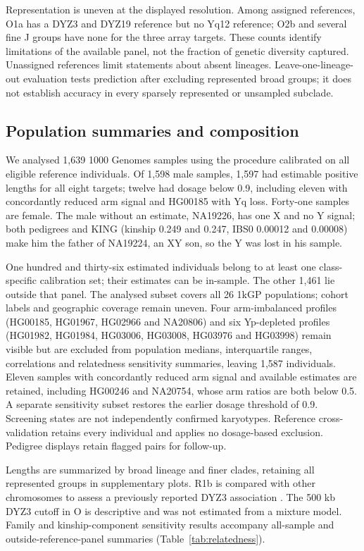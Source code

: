 \documentclass[pdflatex,sn-nature]{sn-jnl}
\begin{document}
Representation is uneven at the displayed resolution. Among assigned references, O1a has a DYZ3 and DYZ19 reference but no Yq12 reference; O2b and several fine J groups have none for the three array targets. These counts identify limitations of the available panel, not the fraction of genetic diversity captured. Unassigned references limit statements about absent lineages. Leave-one-lineage-out evaluation tests prediction after excluding represented broad groups; it does not establish accuracy in every sparsely represented or unsampled subclade.



\subsection{Population summaries and composition}\label{sec:m-population}
We analysed 1,639 1000 Genomes samples using the procedure calibrated on all eligible reference individuals. Of 1,598 male samples, 1,597 had estimable positive lengths for all eight targets; twelve had dosage below 0.9, including eleven with concordantly reduced arm signal and HG00185 with Yq loss. Forty-one samples are female. The male without an estimate, NA19226, has one X and no Y signal; both pedigrees and KING (kinship 0.249 and 0.247, IBS0 0.00012 and 0.00008) make him the father of NA19224, an XY son, so the Y was lost in his sample.

One hundred and thirty-six estimated individuals belong to at least one class-specific calibration set; their estimates can be in-sample. The other 1,461 lie outside that panel. The analysed subset covers all 26 1kGP populations; cohort labels and geographic coverage remain uneven. Four arm-imbalanced profiles (HG00185, HG01967, HG02966 and NA20806) and six Yp-depleted profiles (HG01982, HG01984, HG03006, HG03008, HG03976 and HG03998) remain visible but are excluded from population medians, interquartile ranges, correlations and relatedness sensitivity summaries, leaving 1,587 individuals. Eleven samples with concordantly reduced arm signal and available estimates are retained, including HG00246 and NA20754, whose arm ratios are both below 0.5. A separate sensitivity subset restores the earlier dosage threshold of 0.9. Screening states are not independently confirmed karyotypes. Reference cross-validation retains every individual and applies no dosage-based exclusion. Pedigree displays retain flagged pairs for follow-up.

Lengths are summarized by broad lineage and finer clades, retaining all represented groups in supplementary plots. R1b is compared with other chromosomes to assess a previously reported DYZ3 association \cite{Hallast2023}. The 500 kb DYZ3 cutoff in O is descriptive and was not estimated from a mixture model. Family and kinship-component sensitivity results accompany all-sample and outside-reference-panel summaries (Table~\ref{tab:relatedness}).
\end{document}
